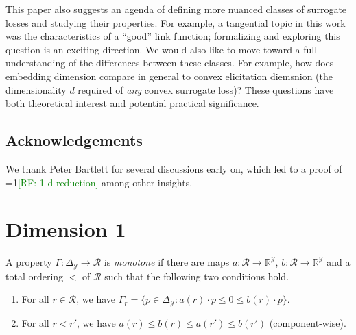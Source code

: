 \documentclass[11pt]{colt2019}
\newcommand{\Comments}{1}
\newcommand{\mynote}[2]{\ifnum\Comments=1\textcolor{#1}{#2}\fi}
\newcommand{\raf}[1]{\mynote{green}{[RF: #1]}}
\newcommand{\reals}{\mathbb{R}}
\newcommand{\simplex}{\Delta_\Y}
\newcommand{\R}{\mathcal{R}}
\newcommand{\Y}{\mathcal{Y}}
\begin{document}
This paper also suggests an agenda of defining more nuanced classes of surrogate losses and studying their properties.
For example, a tangential topic in this work was the characteristics of a ``good'' link function; formalizing and exploring this question is an exciting direction.
We would also like to move toward a full understanding of the differences between these classes.
For example, how does embedding dimension compare in general to convex elicitation diemsnion (the dimensionality $d$ required of \emph{any} convex surrogate loss)?
These questions have both theoretical interest and potential practical significance.

\subsection*{Acknowledgements}
We thank Peter Bartlett for several discussions early on, which led to a proof of \raf{1-d reduction} among other insights.



\appendix

\section{Dimension 1}\label{app:dimension-1}

\begin{definition}\label{def:monotone-prop}
  A property $\Gamma:\simplex\to\R$ is \emph{monotone} if there are maps $a:\R\to\reals^\Y$, $b:\R\to\reals^\Y$ and a total ordering $<$ of $\R$ such that the following two conditions hold.
  \begin{enumerate}
  \item For all $r\in\R$, we have $\Gamma_r = \{p\in\simplex : a(r) \cdot p \leq 0 \leq b(r) \cdot p\}$.
  \item For all $r < r'$, we have $a(r) \leq b(r) \leq a(r') \leq b(r')$ (component-wise).
  \end{enumerate}
\end{definition}
\end{document}
